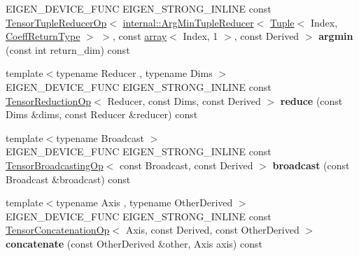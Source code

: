 \begin{DoxyCompactItemize}
\item 
\mbox{\label{class_eigen_1_1_tensor_base_3_01_derived_00_01_read_only_accessors_01_4_ae968d88233576e9d90f9a17c1dce8bb7}} 
E\+I\+G\+E\+N\+\_\+\+D\+E\+V\+I\+C\+E\+\_\+\+F\+U\+NC E\+I\+G\+E\+N\+\_\+\+S\+T\+R\+O\+N\+G\+\_\+\+I\+N\+L\+I\+NE const \hyperlink{class_eigen_1_1_tensor_tuple_reducer_op}{Tensor\+Tuple\+Reducer\+Op}$<$ \hyperlink{struct_eigen_1_1internal_1_1_arg_min_tuple_reducer}{internal\+::\+Arg\+Min\+Tuple\+Reducer}$<$ \hyperlink{struct_eigen_1_1_tuple}{Tuple}$<$ Index, \hyperlink{group___sparse_core___module}{Coeff\+Return\+Type} $>$ $>$, const \hyperlink{class_eigen_1_1array}{array}$<$ Index, 1 $>$, const Derived $>$ {\bfseries argmin} (const int return\+\_\+dim) const
\item 
\mbox{\label{class_eigen_1_1_tensor_base_3_01_derived_00_01_read_only_accessors_01_4_a16106167c886963580b5d743dda20150}} 
{\footnotesize template$<$typename Reducer , typename Dims $>$ }\\E\+I\+G\+E\+N\+\_\+\+D\+E\+V\+I\+C\+E\+\_\+\+F\+U\+NC E\+I\+G\+E\+N\+\_\+\+S\+T\+R\+O\+N\+G\+\_\+\+I\+N\+L\+I\+NE const \hyperlink{class_eigen_1_1_tensor_reduction_op}{Tensor\+Reduction\+Op}$<$ Reducer, const Dims, const Derived $>$ {\bfseries reduce} (const Dims \&dims, const Reducer \&reducer) const
\item 
\mbox{\label{class_eigen_1_1_tensor_base_3_01_derived_00_01_read_only_accessors_01_4_adfa4764770dca26abd6a857ccf922c83}} 
{\footnotesize template$<$typename Broadcast $>$ }\\E\+I\+G\+E\+N\+\_\+\+D\+E\+V\+I\+C\+E\+\_\+\+F\+U\+NC E\+I\+G\+E\+N\+\_\+\+S\+T\+R\+O\+N\+G\+\_\+\+I\+N\+L\+I\+NE const \hyperlink{class_eigen_1_1_tensor_broadcasting_op}{Tensor\+Broadcasting\+Op}$<$ const Broadcast, const Derived $>$ {\bfseries broadcast} (const Broadcast \&broadcast) const
\item 
\mbox{\label{class_eigen_1_1_tensor_base_3_01_derived_00_01_read_only_accessors_01_4_a41076eb35c3f28528347f77057c4e3c0}} 
{\footnotesize template$<$typename Axis , typename Other\+Derived $>$ }\\E\+I\+G\+E\+N\+\_\+\+D\+E\+V\+I\+C\+E\+\_\+\+F\+U\+NC E\+I\+G\+E\+N\+\_\+\+S\+T\+R\+O\+N\+G\+\_\+\+I\+N\+L\+I\+NE const \hyperlink{class_eigen_1_1_tensor_concatenation_op}{Tensor\+Concatenation\+Op}$<$ Axis, const Derived, const Other\+Derived $>$ {\bfseries concatenate} (const Other\+Derived \&other, Axis axis) const

\end{DoxyCompactItemize}
